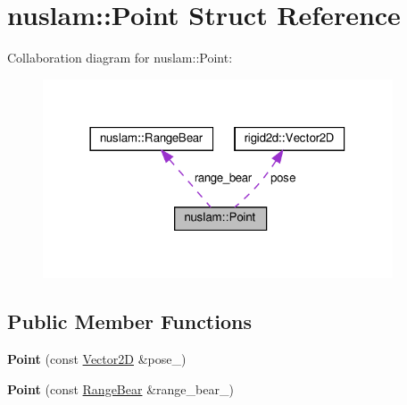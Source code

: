 \hypertarget{structnuslam_1_1Point}{}\section{nuslam\+:\+:Point Struct Reference}
\label{structnuslam_1_1Point}


Collaboration diagram for nuslam\+:\+:Point\+:
\nopagebreak
\begin{figure}[H]
\begin{center}
\leavevmode
\includegraphics[width=294pt]{d4/d4a/structnuslam_1_1Point__coll__graph}
\end{center}
\end{figure}
\subsection*{Public Member Functions}
\begin{DoxyCompactItemize}
\item 
\mbox{\label{structnuslam_1_1Point_a1cd12ede357a20cfbc3d640cea56a9ba}} 
{\bfseries Point} (const \hyperlink{structrigid2d_1_1Vector2D}{Vector2D} \&pose\+\_\+)
\item 
\mbox{\label{structnuslam_1_1Point_ae021d2a3b0c1fc860170204937266e0b}} 
{\bfseries Point} (const \hyperlink{structnuslam_1_1RangeBear}{Range\+Bear} \&range\+\_\+bear\+\_\+)
\end{DoxyCompactItemize}
